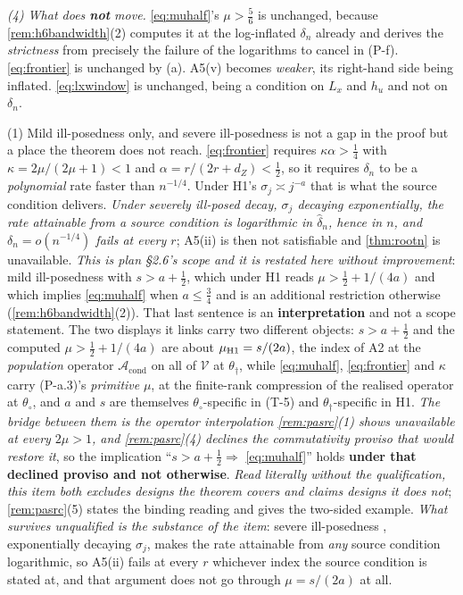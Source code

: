 \begin{remark}
\emph{(4) What does \textbf{not} move.} \eqref{eq:muhalf}'s $\mu>\tfrac56$ is unchanged, because
\cref{rem:h6bandwidth}\textup{(2)} computes it at the log-inflated $\delta_n$ already and derives the
\emph{strictness} from precisely the failure of the logarithms to cancel in (P-f). \eqref{eq:frontier} is
unchanged by (a). A5(v) becomes \emph{weaker}, its right-hand side being inflated.
\eqref{eq:lxwindow} is unchanged, being a condition on $L_x$ and $h_u$ and not on $\delta_n$.
\end{remark}

\begin{remark}\label{rem:rootnscope}
(1) Mild ill-posedness only, and severe ill-posedness is not a gap in the proof but a place the
theorem does not reach. \eqref{eq:frontier} requires $\kappa\alpha>\tfrac14$ with
$\kappa=2\mu/(2\mu+1)<1$ and $\alpha=r/(2r+d_Z)<\tfrac12$, so it requires $\delta_n$ to be a
\emph{polynomial} rate faster than $n^{-1/4}$. Under H1's $\sigma_j\asymp j^{-a}$ that is what the source
condition delivers. \emph{Under severely ill-posed decay, $\sigma_j$ decaying exponentially, the rate
attainable from a source condition is logarithmic in $\hat\delta_n$, hence in $n$, and
$\delta_n=o(n^{-1/4})$ fails at every $r$}; A5(ii) is then not satisfiable and
\cref{thm:rootn} is unavailable. \emph{This is plan \S2.6's scope and it is restated here without
improvement}: mild ill-posedness with $s>a+\tfrac12$, which under H1 reads
$\mu>\tfrac12+1/(4a)$ and which implies \eqref{eq:muhalf} when $a\le\tfrac34$ and is an additional
restriction otherwise (\cref{rem:h6bandwidth}\textup{(2)}).
That last sentence is an \textbf{interpretation} and not a scope statement. The two displays it
links carry two different objects: $s>a+\tfrac12$
and the computed $\mu>\tfrac12+1/(4a)$ are about $\mu_{\text{\textup{H1}}}=s/(2a)$, the index of A2 at the
\emph{population} operator $\mathcal A_{\mathrm{cond}}$ on all of $\mathcal V$ at $\theta_\dagger$, while
\eqref{eq:muhalf}, \eqref{eq:frontier} and $\kappa$ carry (P-a.3)'s \emph{primitive} $\mu$, at the
finite-rank compression of the realised operator at $\theta_\circ$, and $a$ and $s$ are themselves
$\theta_\circ$-specific in (T-5) and $\theta_\dagger$-specific in H1. \emph{The bridge between them is the
operator interpolation \cref{rem:pasrc}\textup{(1)} shows unavailable at every $2\mu>1$, and
\cref{rem:pasrc}\textup{(4)} declines the commutativity proviso that would restore it}, so the implication
``$s>a+\tfrac12\Rightarrow$ \eqref{eq:muhalf}'' holds \textbf{under that declined proviso and not
otherwise}. \emph{Read literally without the qualification, this item both excludes designs the theorem
covers and claims designs it does not}; \cref{rem:pasrc}\textup{(5)} states the binding reading and gives
the two-sided example. \emph{What survives unqualified is the substance of the item}: severe ill-posedness
, exponentially decaying $\sigma_j$, makes the rate attainable from \emph{any} source condition
logarithmic, so A5(ii) fails at every $r$ whichever index the source condition is stated at, and that
argument does not go through $\mu=s/(2a)$ at all.


\end{remark}
